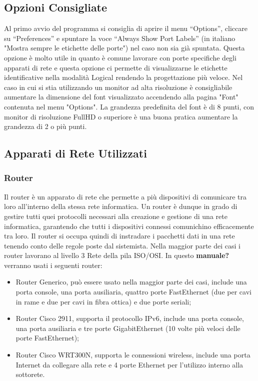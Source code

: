 \subsection{Opzioni Consigliate}
Al primo avvio del programma si consiglia di aprire il menu “Options”, cliccare su “Preferences” e spuntare la voce “Always Show Port Labels” (in italiano "Mostra sempre le etichette delle porte") nel caso non sia già spuntata. Questa opzione è molto utile in quanto è comune lavorare con porte specifiche degli apparati di rete e questa opzione ci permette di visualizzarne le etichette identificative nella modalità Logical rendendo la progettazione più veloce. \newline
\smallskip
\newline
Nel caso in cui si stia utilizzando un monitor ad alta risoluzione è consigliabile aumentare la dimensione del font visualizzato accendendo alla pagina "Font" contenuta nel menu "Options". La grandezza predefinita del font è di 8 punti, con monitor di risoluzione FullHD o superiore è una buona pratica aumentare la grandezza di 2 o più punti.

\subsection{Apparati di Rete Utilizzati}

\subsubsection{Router}
Il router è un apparato di rete che permette a più dispositivi di comunicare tra loro all'interno della stessa rete informatica. Un router è dunque in grado di gestire tutti quei protocolli necessari alla creazione e gestione di una rete informatica, garantendo che tutti i dispositivi connessi comunichino efficacemente tra loro. Il router si occupa quindi di instradare i pacchetti dati in una rete tenendo conto delle regole poste dal sistemista. Nella maggior parte dei casi i router lavorano al livello 3 Rete della pila ISO/OSI. \newline
\smallskip
\newline
In questo \textbf{manuale?} verranno usati i seguenti router:

\begin{itemize}
    \item Router Generico, può essere usato nella maggior parte dei casi, include una porta console, una porta ausiliaria, quattro porte FastEthernet (due per cavi in rame e due per cavi in fibra ottica) e due porte seriali;
    \item Router Cisco 2911, supporta il protocollo IPv6, include una porta console, una porta ausiliaria e tre porte GigabitEthernet (10 volte più veloci delle porte FastEthernet);
    \item Router Cisco WRT300N, supporta le connessioni wireless, include una porta Internet da collegare alla rete e 4 porte Ethernet per l'utilizzo interno alla sottorete.
\end{itemize}

